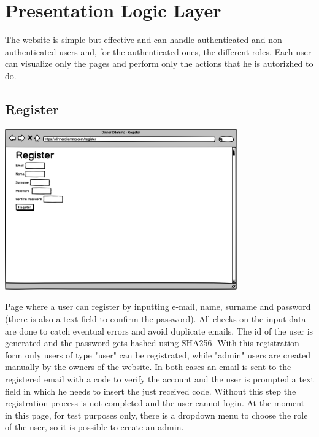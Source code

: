 \section{Presentation Logic Layer}



The website is simple but effective and can handle authenticated and non-authenticated users and, for the authenticated ones, the different roles. 
Each user can visualize only the pages and perform only the actions that he is autorizhed to do.

\subsection{Register}


\includegraphics[width=0.75\textwidth]{images/register.png}

Page where a user can register by inputting e-mail, name, surname and password (there is also a text field to confirm the password). All checks on the input data are done to catch eventual errors and avoid duplicate emails. The id of the user is generated and the password gets hashed using SHA256. With this registration form only users of type "user" can be registrated, while "admin" users are created manually by the owners of the website. In both cases an email is sent to the registered email with a code to verify the account and the user is prompted a text field in which he needs to insert the just received code. Without this step the registration process is not completed and the user cannot login.
At the moment in this page, for test purposes only, there is a dropdown menu to choose the role of the user, so it is possible to create an admin.


